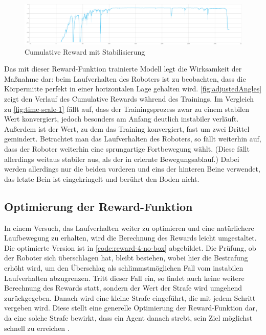 \begin{figure}
    \centering
    \includegraphics[width=\textwidth]{Bilder/ml-agents/Environment_Cumulative Reward_adjustedAngles.pdf}
    \caption{Cumulative Reward mit Stabilisierung}
    \label{fig:adjustedAngles}
\end{figure}

Das mit dieser Reward-Funktion trainierte Modell legt die Wirksamkeit der Maßnahme dar: beim Laufverhalten des Roboters ist zu beobachten, dass die Körpermitte perfekt in einer horizontalen Lage gehalten wird.
\autoref{fig:adjustedAngles} zeigt den Verlauf des Cumulative Rewards während des Trainings.
Im Vergleich zu \autoref{fig:time-scale-1} fällt auf, dass der Trainingsprozess zwar zu einem stabilen Wert konvergiert, jedoch besonders am Anfang deutlich instabiler verläuft.
Außerdem ist der Wert, zu dem das Training konvergiert, fast um zwei Drittel gemindert.
Betrachtet man das Laufverhalten des Roboters, so fällt weiterhin auf, dass der Roboter weiterhin eine sprungartige Fortbewegung wählt.
(Diese fällt allerdings weitaus stabiler aus, als der in \cite{waidner.2020} erlernte Bewegungsablauf.)
Dabei werden allerdings nur die beiden vorderen und eins der hinteren Beine verwendet, das letzte Bein ist eingekringelt und berührt den Boden nicht.

\subsection{Optimierung der Reward-Funktion}
In einem Versuch, das Laufverhalten weiter zu optimieren und eine natürlichere Laufbewegung zu erhalten, wird die Berechnung des Rewards leicht umgestaltet.
Die optimierte Version ist in \autoref{code:reward-4-no-box} abgebildet.
Die Prüfung, ob der Roboter sich überschlagen hat, bleibt bestehen, wobei hier die Bestrafung erhöht wird, um den Überschlag als schlimmstmöglichen Fall vom instabilen Laufverhalten abzugrenzen.
Tritt dieser Fall ein, so findet auch keine weitere Berechnung des Rewards statt, sondern der Wert der Strafe wird umgehend zurückgegeben.
Danach wird eine kleine Strafe eingeführt, die mit jedem Schritt vergeben wird.
Diese stellt eine generelle Optimierung der Reward-Funktion dar, da eine solche Strafe bewirkt, dass ein Agent danach strebt, sein Ziel möglichst schnell zu erreichen \cite{mlagentsReward}.

